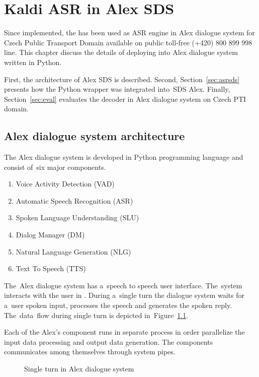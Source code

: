 \chapter{Kaldi \acs{ASR} in Alex \acs{SDS}}
\label{cha:integration}

Since implemented, the  has been used as \ac{ASR} engine in Alex dialogue system for Czech Public Transport Domain available on public toll-free (+420) 800 899 998 line.
This chapter discuss the details of deploying  into Alex dialogue system written in Python.

First, the architecture of Alex \acf{SDS} is described.
Second, Section~\ref{sec:asrsds} presents how the Python wrapper  was integrated into~\ac{SDS} Alex.
Finally, Section~\ref{sec:eval} evaluates the decoder in Alex dialogue system on Czech \ac{PTI} domain. 

\section{Alex dialogue system architecture} 
\label{sec:arch}
The Alex dialogue system is developed in Python programming language and consist of~six major components. 
\begin{enumerate}
    \item Voice Activity Detection (VAD)
    \item Automatic Speech Recognition (ASR) 
    \item Spoken Language Understanding (SLU)
    \item Dialog Manager (DM)
    \item Natural Language Generation (NLG)
    \item Text To Speech (TTS)
\end{enumerate}
The~Alex dialogue system has a~speech to speech user interface. 
The~system interacts with the user in . 
During a~single turn the dialogue system waits for a~user spoken input, processes the speech and generates the spoken reply.
The~data~flow during single turn is depicted in~Figure~\ref{fig:alex}.

Each of the Alex's component runs in separate process in order parallelize the input data processing and output data generation.
The components communicates among themselves through system pipes.

\begin{figure}
    \begin{center}
    
    \caption{Single turn in Alex dialogue system}
    \label{fig:alex} 
    \end{center}
\end{figure}

